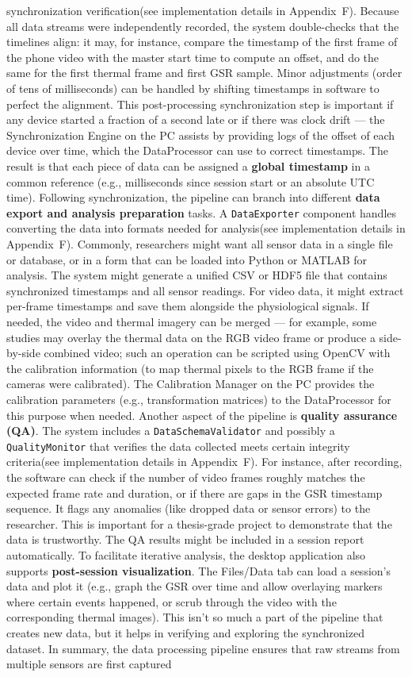 synchronization verification(see implementation details in Appendix~F). Because all data streams were independently recorded, the system double-checks that the timelines align: it may, for instance, compare the timestamp of the first frame of the phone video with the master start time to compute an offset, and do the same for the first thermal frame and first GSR sample. Minor adjustments (order of tens of milliseconds) can be handled by shifting timestamps in software to perfect the alignment. This post-processing synchronization step is important if any device started a fraction of a second late or if there was clock drift --- the Synchronization Engine on the PC assists by providing logs of the offset of each device over time, which the DataProcessor can use to correct timestamps. The result is that each piece of data can be assigned a \textbf{global timestamp} in a common reference (e.g., milliseconds since session start or an absolute UTC time). Following synchronization, the pipeline can branch into different \textbf{data export and analysis preparation} tasks. A \texttt{DataExporter} component handles converting the data into formats needed for analysis(see implementation details in Appendix~F). Commonly, researchers might want all sensor data in a single file or database, or in a form that can be loaded into Python or MATLAB for analysis. The system might generate a unified CSV or HDF5 file that contains synchronized timestamps and all sensor readings. For video data, it might extract per-frame timestamps and save them alongside the physiological signals. If needed, the video and thermal imagery can be merged --- for example, some studies may overlay the thermal data on the RGB video frame or produce a side-by-side combined video; such an operation can be scripted using OpenCV with the calibration information (to map thermal pixels to the RGB frame if the cameras were calibrated). The Calibration Manager on the PC provides the calibration parameters (e.g., transformation matrices) to the DataProcessor for this purpose when needed. Another aspect of the pipeline is \textbf{quality assurance (QA)}. The system includes a \texttt{DataSchemaValidator} and possibly a \texttt{QualityMonitor} that verifies the data collected meets certain integrity criteria(see implementation details in Appendix~F). For instance, after recording, the software can check if the number of video frames roughly matches the expected frame rate and duration, or if there are gaps in the GSR timestamp sequence. It flags any anomalies (like dropped data or sensor errors) to the researcher. This is important for a thesis-grade project to demonstrate that the data is trustworthy. The QA results might be included in a session report automatically. To facilitate iterative analysis, the desktop application also supports \textbf{post-session visualization}. The Files/Data tab can load a session's data and plot it (e.g., graph the GSR over time and allow overlaying markers where certain events happened, or scrub through the video with the corresponding thermal images). This isn't so much a part of the pipeline that creates new data, but it helps in verifying and exploring the synchronized dataset. In summary, the data processing pipeline ensures that raw streams from multiple sensors are first captured 